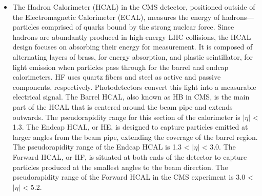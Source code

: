 \begin{itemize}
\item The Hadron Calorimeter (HCAL) \cite{Isik:2810162} in the CMS detector, positioned outside of the Electromagnetic Calorimeter (ECAL), measures the energy of hadrons—particles comprised of quarks bound by the strong nuclear force. Since hadrons are abundantly produced in high-energy LHC collisions, the HCAL design focuses on absorbing their energy for measurement. It is composed of alternating layers of brass, for energy absorption, and plastic scintillator, for light emission when particles pass through for the barrel and endcap calorimeters. HF uses quartz fibers and steel as active and passive components, respectively. Photodetectors convert this light into a measurable electrical signal. The Barrel HCAL, also known as HB in CMS, is the main part of the HCAL that is centered around the beam pipe and extends outwards. The pseudorapidity range for this section of the calorimeter is $|\eta|$ < 1.3. The Endcap HCAL, or HE, is designed to capture particles emitted at larger angles from the beam pipe, extending the coverage of the barrel region. The pseudorapidity range of the Endcap HCAL is 1.3 < $|\eta|$ < 3.0. The Forward HCAL, or HF, is situated at both ends of the detector to capture particles produced at the smallest angles to the beam direction. The pseudorapidity range of the Forward HCAL in the CMS experiment is 3.0 < $|\eta|$ < 5.2.




\end{itemize}
